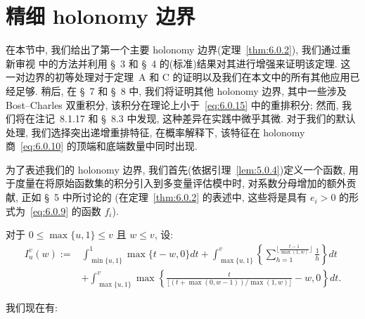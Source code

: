 \section{精细 holonomy 边界}\label{sec:6}

在本节中, 我们给出了第一个主要 holonomy 边界(定理~\ref{thm:6.0.2}), 我们通过重新审视 \cite[§ 2.5]{CDT21} 中的方法并利用 \S~3 和 \S~4 的(标准)结果对其进行增强来证明该定理.
这一对边界的初等处理对于定理~A 和 C 的证明以及我们在本文中的所有其他应用已经足够.
稍后, 在 \S~7 和 \S~8 中, 我们将证明其他 holonomy 边界, 其中一些涉及 Bost--Charles 双重积分, 该积分在理论上小于~\eqref{eq:6.0.15} 中的重排积分; 然而, 我们将在注记~8.1.17 和 \S~8.3 中发现, 这种差异在实践中微乎其微.
对于我们的默认处理, 我们选择突出递增重排特征, 在概率解释下, 该特征在 holonomy 商~\eqref{eq:6.0.10} 的顶端和底端数量中同时出现.

为了表述我们的 holonomy 边界, 我们首先(依据引理~\ref{lem:5.0.4})定义一个函数, 用于度量在将原始函数集的积分引入到多变量评估模中时, 对系数分母增加的额外贡献, 正如 \S~5 中所讨论的 (在定理~\ref{thm:6.0.2} 的表述中, 这些将是具有 $e_i > 0$ 的形式为~\eqref{eq:6.0.9} 的函数 $f_i$).

\begin{definition}\label{def:6.0.1}
对于 $0 \le \max\{u, 1\} \le v$ 且 $w \le v$, 设:
\[
\begin{aligned}
I_{u}^{v}(w) :=& \int_{\min\{u,1\}}^{1} \max\{t-w, 0\} dt + \int_{\max\{u,1\}}^{v} \left\{ \sum_{h=1}^{\lfloor \frac{t-1}{\max(1,w)} \rfloor} \frac{1}{h} \right\} dt \\
&+ \int_{\max\{u,1\}}^{v} \max\left\{ \frac{t}{\lfloor (t + \max(0, w - 1))/\max(1, w) \rfloor} - w, 0 \right\} dt.
\end{aligned}
\]
\end{definition}

我们现在有:

